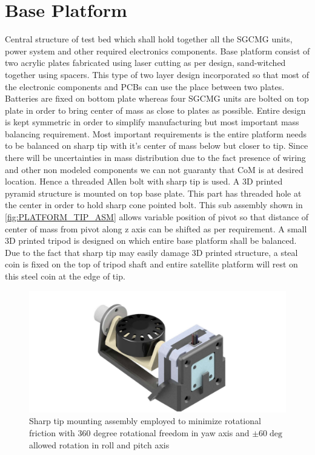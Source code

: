 \section{Base Platform}
Central structure of test bed which shall hold together all the SGCMG units, power system and other required electronics components. Base platform consist of two acrylic plates fabricated using laser cutting as per design, sand-witched together using spacers. This type of two layer design incorporated so that most of the electronic components and PCBs can use the place between two plates. Batteries are fixed on bottom plate whereas four SGCMG units are bolted on top plate in order to bring center of mass as close to plates as possible. Entire design is kept symmetric in order to simplify manufacturing but most important mass balancing requirement. Most important requirements is the entire platform needs to be balanced on sharp tip with it's center of mass below but closer to tip. Since there will be uncertainties in mass distribution due to the fact presence of wiring and other non modeled components we can not guaranty that CoM is at desired location. Hence a threaded Allen bolt with sharp tip is used. A 3D printed pyramid structure is mounted on top base plate. This part has threaded hole at the center in order to hold sharp cone pointed bolt. This sub assembly shown in \autoref{fig:PLATFORM_TIP_ASM} allows variable position of pivot so that distance of center of mass from pivot along z axis can be shifted as per requirement. A small 3D printed tripod is designed on which entire base platform shall be balanced. Due to the fact that sharp tip may easily damage 3D printed structure, a steal coin is fixed on the top of tripod shaft and entire satellite platform will rest on this steel coin at the edge of tip.

\begin{figure}[ht]
    \centering
    \includegraphics[width=\textwidth]{figures/Assembly/SGCMG.pdf}
    \caption{Sharp tip mounting assembly employed to minimize rotational friction with 360 degree rotational freedom in yaw axis and $\pm 60 \deg$ allowed rotation in roll and pitch axis}
    \label{fig:PLATFORM_TIP_ASM}
\end{figure}

